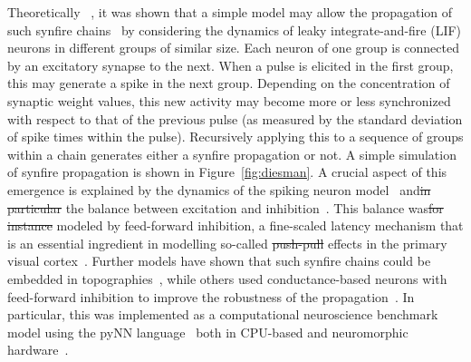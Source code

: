 \documentclass[brainsci, %
               review,accept,pdftex,moreauthors %
               ]{Definitions/mdpi}
\providecommand{\DIFadd}[1]{{\protect\color{blue}\uwave{#1}}} %
\providecommand{\DIFdel}[1]{{\protect\color{red}\sout{#1}}}                      %
\providecommand{\DIFaddbegin}{} %
\providecommand{\DIFaddend}{} %
\providecommand{\DIFdelbegin}{} %
\providecommand{\DIFdelend}{} %
\newcommand{\DIFscaledelfig}{0.5}
\newlength{\DIFdelgraphicswidth} %
\newlength{\DIFdelgraphicsheight} %
\newcommand{\DIFaddincludegraphics}[2][]{{\color{blue}\fbox{\DIFOincludegraphics[#1]{#2}}}} %
\newcommand{\DIFdelincludegraphics}[2][]{%
\sbox{\DIFdelgraphicsbox}{\DIFOincludegraphics[#1]{#2}}%
\settoboxwidth{\DIFdelgraphicswidth}{\DIFdelgraphicsbox} %
\settoboxtotalheight{\DIFdelgraphicsheight}{\DIFdelgraphicsbox} %
\scalebox{\DIFscaledelfig}{%
\parbox[b]{\DIFdelgraphicswidth}{\usebox{\DIFdelgraphicsbox}\\[-\baselineskip] \rule{\DIFdelgraphicswidth}{0em}}\llap{\resizebox{\DIFdelgraphicswidth}{\DIFdelgraphicsheight}{%
\setlength{\unitlength}{\DIFdelgraphicswidth}%
\begin{picture}(1,1)%
\thicklines\linethickness{2pt} %
{\color[rgb]{1,0,0}\put(0,0){\framebox(1,1){}}}%
{\color[rgb]{1,0,0}\put(0,0){\line( 1,1){1}}}%
{\color[rgb]{1,0,0}\put(0,1){\line(1,-1){1}}}%
\end{picture}%
}\hspace*{3pt}}} %
} %
\DeclareRobustCommand{\DIFaddbegin}{\DIFOaddbegin \let\includegraphics\DIFaddincludegraphics} %
\DeclareRobustCommand{\DIFaddend}{\DIFOaddend \let\includegraphics\DIFOincludegraphics} %
\DeclareRobustCommand{\DIFdelbegin}{\DIFOdelbegin \let\includegraphics\DIFdelincludegraphics} %
\DeclareRobustCommand{\DIFdelend}{\DIFOaddend \let\includegraphics\DIFOincludegraphics} %
\begin{document}
Theoretically\DIFdelbegin %
\DIFdelend \DIFaddbegin {}\DIFaddend ~\citep{deneve_bayesian_2004, ballard_dual_2011}, it was shown that a simple model may allow the propagation of such synfire chains~\citep{gewaltig_propagation_2001} by considering the dynamics of leaky integrate-and-fire (LIF) neurons in different groups of \DIFaddbegin \DIFadd{a }\DIFaddend similar size. Each neuron of one group is connected by an excitatory synapse to the next. When a pulse is elicited in the first group, this may generate a spike in the next group. Depending on the concentration of synaptic weight values, this new activity may become more or less synchronized with respect to that of the previous pulse (as measured by the standard deviation of spike times within the pulse). Recursively applying this to a sequence of groups within a chain generates either a synfire propagation or not. A simple simulation of synfire propagation is shown in Figure~\ref{fig:diesman}. A crucial aspect of this emergence is explained by the dynamics of the spiking neuron model~\citep{gerstner_time_1995} and\DIFdelbegin \DIFdel{in particular }\DIFdelend \DIFaddbegin \DIFadd{, in particular, }\DIFaddend the balance between excitation and inhibition~\citep{azouz_stimulus-selective_2008}. This balance was\DIFdelbegin \DIFdel{for instance }\DIFdelend \DIFaddbegin \DIFadd{, for instance, }\DIFaddend modeled by feed-forward inhibition, a fine-scaled latency mechanism that is an essential ingredient in modelling so-called \DIFdelbegin \DIFdel{push-pull }\DIFdelend \DIFaddbegin \DIFadd{push--pull }\DIFaddend effects in the primary visual cortex~\citep{kremkow_push-pull_2016}. Further models have shown that such synfire chains could be embedded in topographies~\citep{aviel_embedding_2003}, while others used conductance-based neurons with feed-forward inhibition to improve the robustness of the propagation~\citep{kremkow_functional_2010}. In particular, this was implemented as a computational neuroscience benchmark model using the pyNN language~\citep{davison_pynn_2008} both in CPU-based and neuromorphic hardware~\citep{pfeil_six_2013}. %
%
\end{document}
